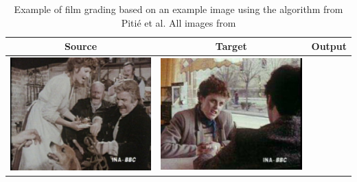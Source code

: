 \begin{table}[H]
    \centering
    \caption{Example of film grading based on an example image using the algorithm from Piti\'{e} et al. All images from \cite{pitie_2007_grading} \label{tab:pitie_demo}}
\begin{tabular}{|c|c|c|}
    \hline
    Source & Target & Output \\
    \hline
  \begin{minipage}{.29\textwidth}
    \includegraphics[width=\textwidth,height=\textheight,keepaspectratio]{images/pitie_original}
  \end{minipage} & 
  \begin{minipage}{.29\textwidth}
    \includegraphics[width=\textwidth,height=\textheight,keepaspectratio]{images/pitie_target1}

\end{minipage}
\end{tabular}
\end{table}
